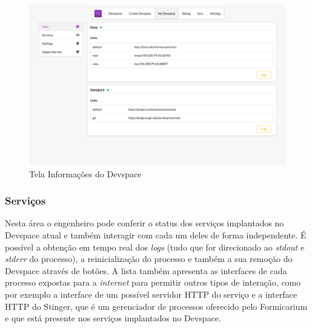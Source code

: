 \begin{figure}[htb]
	\caption{\label{fig_frontend_devspace_info}Tela Informações do Devspace}
	\begin{center}
	\includegraphics[width=\textwidth,keepaspectratio]{pictures/frontend/frontend-devspace-info.png}
	\end{center}
\end{figure}

\subsubsection{Serviços}

Nesta área o engenheiro pode conferir o status dos serviços implantados no Devspace atual e também interagir com cada um deles de forma independente. É possível a obtenção em tempo real dos \textit{logs} (tudo que for direcionado ao \textit{stdout} e \textit{stderr} do processo), a reinicialização do processo e também a sua remoção do Devspace através de botões. A lista também apresenta as interfaces de cada processo expostas para a \textit{internet} para permitir outros tipos de interação, como por exemplo a interface de um possível servidor HTTP do serviço e a interface HTTP do Stinger, que é um gerenciador de processos oferecido pelo Formicarium e que está presente nos serviços implantados no Devspace.

